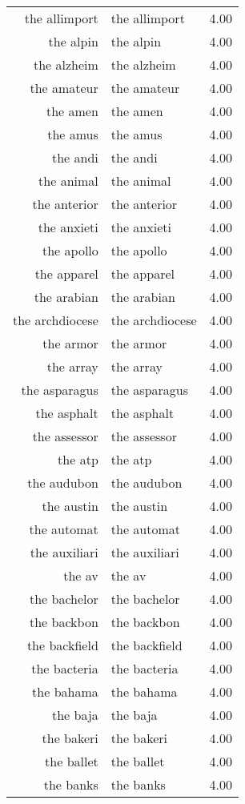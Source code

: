 \begin{table}[ht]
\begin{tabular}{rlr}
  the allimport & the allimport & 4.00 \\ 
  the alpin & the alpin & 4.00 \\ 
  the alzheim & the alzheim & 4.00 \\ 
  the amateur & the amateur & 4.00 \\ 
  the amen & the amen & 4.00 \\ 
  the amus & the amus & 4.00 \\ 
  the andi & the andi & 4.00 \\ 
  the animal & the animal & 4.00 \\ 
  the anterior & the anterior & 4.00 \\ 
  the anxieti & the anxieti & 4.00 \\ 
  the apollo & the apollo & 4.00 \\ 
  the apparel & the apparel & 4.00 \\ 
  the arabian & the arabian & 4.00 \\ 
  the archdiocese & the archdiocese & 4.00 \\ 
  the armor & the armor & 4.00 \\ 
  the array & the array & 4.00 \\ 
  the asparagus & the asparagus & 4.00 \\ 
  the asphalt & the asphalt & 4.00 \\ 
  the assessor & the assessor & 4.00 \\ 
  the atp & the atp & 4.00 \\ 
  the audubon & the audubon & 4.00 \\ 
  the austin & the austin & 4.00 \\ 
  the automat & the automat & 4.00 \\ 
  the auxiliari & the auxiliari & 4.00 \\ 
  the av & the av & 4.00 \\ 
  the bachelor & the bachelor & 4.00 \\ 
  the backbon & the backbon & 4.00 \\ 
  the backfield & the backfield & 4.00 \\ 
  the bacteria & the bacteria & 4.00 \\ 
  the bahama & the bahama & 4.00 \\ 
  the baja & the baja & 4.00 \\ 
  the bakeri & the bakeri & 4.00 \\ 
  the ballet & the ballet & 4.00 \\ 
  the banks & the banks & 4.00 \\ 

\end{tabular}
\end{table}
